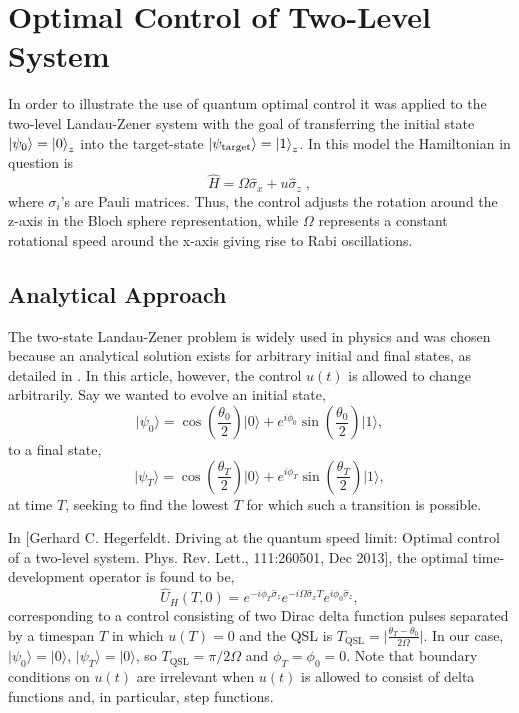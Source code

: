 \chapter{Optimal Control of Two-Level System}
In order to illustrate the use of quantum optimal control it was applied to the two-level Landau-Zener system with the goal of transferring the initial state $\ket{\psi _0} = \ket{0}_z$ into the target-state $\ket{\psi _{\mathrm{target}}} = \ket{1}_z$. In this model the Hamiltonian in question is
\begin{equation}\label{eq:LZ_ham}
	\hat{H} = \Omega \hat{\sigma}_x + u \hat{\sigma}_z \; ,
\end{equation}
where $\sigma_i$'s are Pauli matrices. Thus, the control adjusts the rotation around the z-axis in the Bloch sphere representation, while $\Omega$ represents a constant rotational speed around the x-axis giving rise to Rabi oscillations.

\section{Analytical Approach}
The two-state Landau-Zener problem is widely used in physics and was chosen because an analytical solution exists for arbitrary initial and final states, as detailed in \cite{QOCTtwolevel}. In this article, however, the control $u(t)$ is allowed to change arbitrarily. Say we wanted to evolve an initial state,
\begin{equation}
\lvert \psi_0 \rangle = \cos{\left(\frac{\theta_0}{2}\right)} \lvert 0 \rangle + e^{i\phi_0}\sin{\left(\frac{\theta_0}{2}\right)}\lvert 1 \rangle,
\end{equation}
to a final state,
\begin{equation}
\lvert \psi_T \rangle = \cos{\left(\frac{\theta_T}{2}\right)} \lvert 0 \rangle + e^{i\phi_T}\sin{\left(\frac{\theta_T}{2}\right)}\lvert 1 \rangle,
\end{equation}
at time $T$, seeking to find the lowest $T$ for which such a transition is possible.

In [Gerhard C. Hegerfeldt. Driving at the quantum speed limit: Optimal control of a
two-level system. Phys. Rev. Lett., 111:260501, Dec 2013], the optimal time-development operator is found to be,
\begin{equation}
\hat{U}_H(T,0)=e^{-i\phi_T\hat{\sigma}_z}e^{-i\Omega\hat{\sigma}_xT}e^{i\phi_0\hat{\sigma}_z},
\end{equation}
corresponding to a control consisting of two Dirac delta function pulses separated by a timespan $T$ in which $u(T)=0$ and the QSL is $T_{\mathrm{QSL}}=\lvert\frac{\theta_T-\theta_0}{2\Omega}\rvert$. In our case, $\lvert\psi_0\rangle=\lvert 0\rangle$, $\lvert\psi_T\rangle=\lvert 0\rangle$, so $T_{\mathrm{QSL}}=\pi/2\Omega$ and $\phi_T=\phi_0=0$. Note that boundary conditions on $u(t)$ are irrelevant when $u(t)$ is allowed to consist of delta functions and, in particular, step functions.

